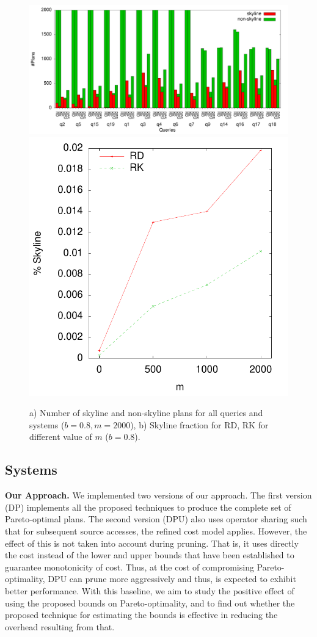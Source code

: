 \begin{figure}[htb]
  \centering
  \includegraphics[width=0.7\linewidth]{figs/all_queries.pdf}
  \includegraphics[width=0.29\linewidth]{figs/plans_skyline_by_m.pdf}
  \caption{a) Number of skyline and non-skyline plans for all queries
    and systems ($b=0.8, m=2000$), b) Skyline fraction for RD, RK for
    different value of $m$ ($b=0.8$).}
  \label{fig:queries}
\end{figure}

\subsection{Systems}
\textbf{Our Approach.} We implemented two versions of our
approach. The first version (DP) implements all the proposed techniques to produce the complete set of Pareto-optimal plans. The second
version (DPU) also uses operator sharing such that for subsequent source accesses, the refined cost model applies. However, the effect of this is not taken into account during pruning.  That is, it uses directly the cost instead of the lower and upper bounds that have been established to guarantee monotonicity of cost. Thus, at the cost of compromising Pareto-optimality, DPU can prune more aggressively and thus, is expected to exhibit better performance. With this baseline, we aim to study the positive effect of using the proposed bounds on Pareto-optimality, and to find out whether the proposed technique for estimating the bounds is effective in reducing the overhead resulting from that.


